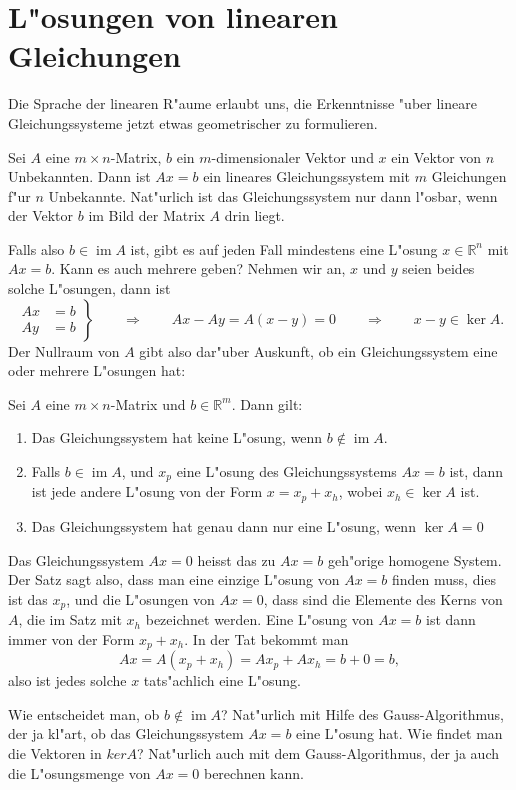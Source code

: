 \section{L"osungen von linearen Gleichungen}
Die Sprache der linearen R"aume erlaubt uns, die Erkenntnisse "uber
lineare Gleichungssysteme jetzt etwas geometrischer zu formulieren.

Sei $A$ eine $m\times n$-Matrix, $b$ ein $m$-dimensionaler Vektor und $x$
ein Vektor von $n$ Unbekannten.
Dann ist $Ax=b$ ein lineares Gleichungssystem
mit $m$ Gleichungen f"ur $n$ Unbekannte.
Nat"urlich ist das Gleichungssystem
nur dann l"osbar, wenn der Vektor $b$ im Bild der Matrix $A$ drin liegt.

Falls also $b\in\operatorname{im}A$ ist, gibt es auf jeden Fall mindestens
eine L"osung $x\in\mathbb R^n$ mit $Ax=b$.
Kann es auch mehrere geben? Nehmen
wir an, $x$ und $y$ seien beides solche L"osungen, dann ist
\[
\left.
\begin{aligned}
Ax&=b\\
Ay&=b
\end{aligned}
\right\}
\qquad\Rightarrow\qquad
Ax-Ay=A(x-y)=0
\qquad\Rightarrow\qquad
x-y\in\operatorname{ker}A.
\]
Der Nullraum von $A$ gibt also dar"uber Auskunft, ob ein Gleichungssystem
eine oder mehrere L"osungen hat:
\begin{satz}
Sei $A$ eine $m\times n$-Matrix und $b\in\mathbb R^m$.
Dann gilt:
\begin{enumerate}
\item Das Gleichungssystem hat keine L"osung, wenn $b\not\in \operatorname{im}A$.
\item Falls $b\in\operatorname{im}A$, und $x_p$ eine L"osung des Gleichungssystems
$Ax=b$ ist, dann ist jede andere L"osung von der Form $x=x_p+x_h$, wobei
$x_h\in\operatorname{ker}A$ ist.
\item Das Gleichungssystem hat genau dann nur eine L"osung, wenn $\operatorname{ker}A=0$
\end{enumerate}
\end{satz}
Das Gleichungssystem $Ax=0$ heisst das zu $Ax=b$ geh"orige homogene System.
Der Satz sagt also, dass man eine einzige L"osung von $Ax=b$ finden muss,
dies ist das $x_p$, und die L"osungen von $Ax=0$, dass sind die Elemente
des Kerns von $A$, die im Satz mit $x_h$ bezeichnet werden.
Eine L"osung von $Ax=b$ ist dann immer von der Form $x_p+x_h$.
In der Tat bekommt
man 
\[
Ax=A(x_p+x_h)=Ax_p+Ax_h=b+0=b,
\]
also ist jedes solche $x$ tats"achlich eine L"osung.

Wie entscheidet man, ob $b\not\in\operatorname{im}A$? Nat"urlich mit
Hilfe des Gauss-Algorithmus, der ja kl"art, ob das Gleichungssystem
$Ax=b$ eine L"osung hat.
Wie findet man die Vektoren in $ker A$?
Nat"urlich auch mit dem Gauss-Algorithmus, der ja auch die L"osungsmenge
von $Ax=0$ berechnen kann.

